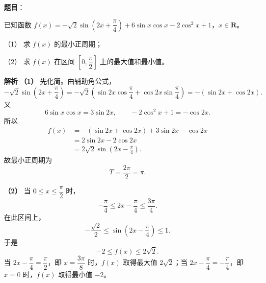 \begin{answer}

\textbf{题目}：

已知函数 $f(x)=-\sqrt2\sin\left(2x+\dfrac{\pi}{4}\right)+6\sin x\cos x-2\cos^2x+1$，$x\in\mathbf{R}$。

（1） 求 $f(x)$ 的最小正周期；

（2） 求 $f(x)$ 在区间 $\left[0,\dfrac{\pi}{2}\right]$ 上的最大值和最小值。

\textbf{解析}
\textbf{（1）} 先化简。由辅助角公式，
\nopagebreak[4]
\[-\sqrt2\sin\left(2x+\frac\pi4\right)
=-\sqrt2\left(\sin2x\cos\frac\pi4+\cos2x\sin\frac\pi4\right)
=-(\sin2x+\cos2x).\]
又
\nopagebreak[4]
\[6\sin x\cos x=3\sin2x,\qquad
-2\cos^2x+1=-\cos2x.\]
所以
\nopagebreak[4]
\[\begin{aligned}
f(x)
&=-(\sin2x+\cos2x)+3\sin2x-\cos2x\\
&=2\sin2x-2\cos2x\\
&=2\sqrt2\sin\left(2x-\frac\pi4\right).
\end{aligned}\]
故最小正周期为
\nopagebreak[4]
\[T=\frac{2\pi}{2}=\pi.\]

\textbf{（2）} 当 $0\leqslant x\leqslant\dfrac\pi2$ 时，
\nopagebreak[4]
\[-\frac\pi4\leqslant 2x-\frac\pi4\leqslant\frac{3\pi}{4}.\]
在此区间上，
\nopagebreak[4]
\[-\frac{\sqrt2}{2}\leqslant\sin\left(2x-\frac\pi4\right)\leqslant1.\]
于是
\nopagebreak[4]
\[-2\leqslant f(x)\leqslant2\sqrt2.\]
当 $2x-\dfrac\pi4=\dfrac\pi2$，即 $x=\dfrac{3\pi}{8}$ 时，$f(x)$ 取得最大值 $2\sqrt2$；当 $2x-\dfrac\pi4=-\dfrac\pi4$，即 $x=0$ 时，$f(x)$ 取得最小值 $-2$。



\end{answer}
